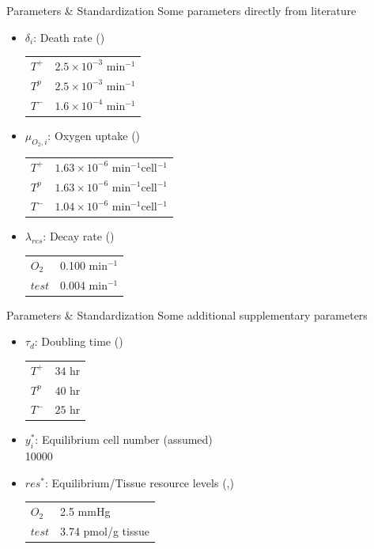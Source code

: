 \documentclass[aspectratio=169,9pt]{beamer}
\begin{document}
\begin{frame}{Parameters \& Standardization}
  Some parameters directly from literature
  \begin{itemize}
    \item $\delta_i$: Death rate (\cite{Jain})\\
    \begin{tabular}{ll}
      $T^+$ & $2.5 \times 10^{-3}$ min$^{-1}$\\
      $T^p$ & $2.5 \times 10^{-3}$ min$^{-1}$\\
      $T^-$ & $1.6 \times 10^{-4}$ min$^{-1}$\\
    \end{tabular}
    \item $\mu_{O_2,i}$: Oxygen uptake (\cite{HailJr})\\
    \begin{tabular}{ll}
      $T^+$ & $1.63 \times 10^{-6}$ min$^{-1}$cell$^{-1}$\\
      $T^p$ & $1.63 \times 10^{-6}$ min$^{-1}$cell$^{-1}$\\
      $T^-$ & $1.04 \times 10^{-6}$ min$^{-1}$cell$^{-1}$\\
    \end{tabular}
    \item $\lambda_{res}$: Decay rate (\cite{Jain})\\
    \begin{tabular}{ll}
      $O_2$ & 0.100 min$^{-1}$\\
      $test$ & 0.004 min$^{-1}$\\
    \end{tabular}
  \end{itemize}
\end{frame}
\begin{frame}{Parameters \& Standardization}
  Some additional supplementary parameters
  \begin{itemize}
    \item $\tau_d$: Doubling time (\cite{atcc})\\
    \begin{tabular}{ll}
      $T^+$ & $34$ hr \\
      $T^p$ & $40$ hr \\
      $T^-$ & $25$ hr \\
    \end{tabular}
    \item $y_i^*$: Equilibrium cell number (assumed)\\
    10000
    \item $res^*$: Equilibrium/Tissue resource levels (\cite{Steward},\cite{Titus})\\
    \begin{tabular}{ll}
      $O_2$    & 2.5 mmHg          \\
      $test$   & 3.74 pmol/g tissue\\
    \end{tabular}
  \end{itemize}
\end{frame}
\end{document}
